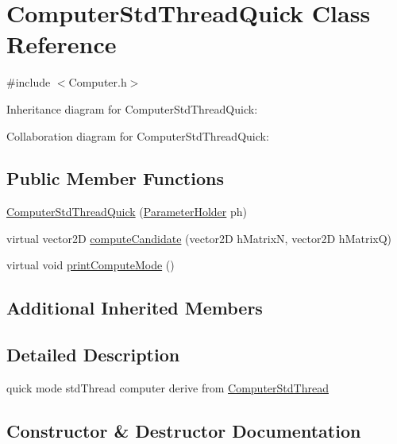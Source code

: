 \hypertarget{classComputerStdThreadQuick}{}\section{Computer\+Std\+Thread\+Quick Class Reference}
\label{classComputerStdThreadQuick}


{\ttfamily \#include $<$Computer.\+h$>$}



Inheritance diagram for Computer\+Std\+Thread\+Quick\+:


Collaboration diagram for Computer\+Std\+Thread\+Quick\+:
\subsection*{Public Member Functions}
\begin{DoxyCompactItemize}
\item 
\hyperlink{classComputerStdThreadQuick_a865f08e7f5ac2ff96078fea3ea11e66c}{Computer\+Std\+Thread\+Quick} (\hyperlink{structParameterHolder}{Parameter\+Holder} ph)
\item 
virtual vector2D \hyperlink{classComputerStdThreadQuick_a1ed5ffc1bdf290bf45821f923e18cdea}{compute\+Candidate} (vector2D h\+MatrixN, vector2D h\+MatrixQ)
\item 
virtual void \hyperlink{classComputerStdThreadQuick_a53bd310ef532a12796acdc00d07641f6}{print\+Compute\+Mode} ()
\end{DoxyCompactItemize}
\subsection*{Additional Inherited Members}


\subsection{Detailed Description}
quick mode std\+Thread computer derive from \hyperlink{classComputerStdThread}{Computer\+Std\+Thread} 

\subsection{Constructor \& Destructor Documentation}
